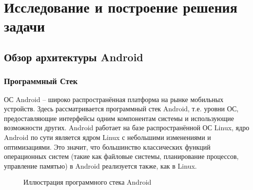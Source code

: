 \section{Исследование и построение решения задачи}
\label{issled}

\subsection{Обзор архитектуры Android}
\subsubsection{Программный Стек}
\label{androidDesc}

ОС Android -- широко распространённая платформа на рынке мобильных
устройств. Здесь рассматривается программный стек Android, т.е. уровни
ОС, предоставляющие интерфейсы одним компонентам системы и использующие
возможности других. Android работает на базе распространённой ОС Linux, 
ядро Android по сути является ядром Linux с небольшими изменениями и
оптимизациями. Это значит, что большинство классических функций
операционных систем (такие как файловые системы, планирование процессов,
управление памятью) в Android реализуется также, как в Linux. 

\begin{figure}
\centering
{} 
\caption{Иллюстрация программного стека Android}
\end{figure}

